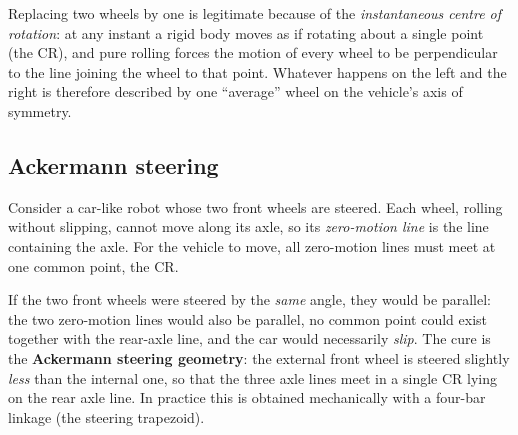 \documentclass[11pt,a4paper]{article}
\theoremstyle{definition}
\theoremstyle{plain}
\theoremstyle{remark}
\begin{document}
\begin{intuition}
Replacing two wheels by one is legitimate because of the \emph{instantaneous centre of rotation}:
at any instant a rigid body moves as if rotating about a single point (the CR), and pure rolling forces the motion of every wheel to be perpendicular to the line joining the wheel to that point. Whatever happens on the left and the right is therefore described by one ``average'' wheel on the vehicle's axis of symmetry.
\end{intuition}

\subsection{Ackermann steering}

Consider a car-like robot whose two front wheels are steered. Each wheel, rolling without slipping, cannot move along its axle, so its \emph{zero-motion line} is the line containing the axle. For the vehicle to move, all zero-motion lines must meet at one common point, the CR.

If the two front wheels were steered by the \emph{same} angle, they would be parallel: the two zero-motion lines would also be parallel, no common point could exist together with the rear-axle line, and the car would necessarily \emph{slip}.
The cure is the \textbf{Ackermann steering geometry}: the external front wheel is steered slightly \emph{less} than the internal one, so that the three axle lines meet in a single CR lying on the rear axle line. In practice this is obtained mechanically with a four-bar linkage (the steering trapezoid).
\end{document}
